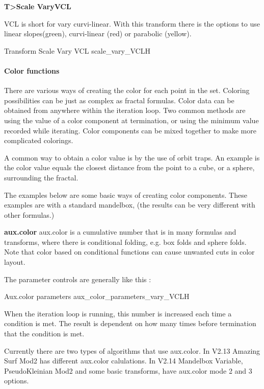 \textbf{T>Scale VaryVCL}

VCL is short for vary curvi-linear. With this transform there is the options to use linear slopes(green), curvi-linear (red) or parabolic (yellow).

{Transform Scale Vary VCL}
{scale_vary_VCL}{H}




\paragraph{Color functions}

There are various ways of creating the color for each point in the set. Coloring possibilities  can be just as complex as fractal formulas. Color data can be obtained from anywhere within the iteration loop. Two common methods are using the value of a color component at termination, or using the minimum value recorded while iterating. Color components can be mixed together to make more complicated colorings.

A common way to obtain a color value is by the use of orbit traps. An example is the color value equals the closest distance from the point to a cube, or a sphere, surrounding the fractal.

The examples below are some basic ways of creating color components. These examples are with a standard  mandelbox, (the results can be very different with other formulas.)


\textbf{aux.color}
aux.color is a cumulative number that is in many formulas and transforms,  where there is conditional folding, e.g. box folds and sphere folds. Note that color based on conditional functions can cause unwanted cuts in color layout.

The parameter controls are generally like this :

{Aux.color parameters}
{aux_color_parameters_vary_VCL}{H}

When the iteration loop is running, this number is increased each time a condition is met.  The result is dependent on how many times before termination  that the condition is met.

Currently there are two types of algorithms that use aux.color. In V2.13 Amazing Surf Mod2 has different aux.color calulations. In V2.14 Mandelbox Variable, PseudoKleinian Mod2 and some basic transforms, have aux.color mode 2 and 3 options.

